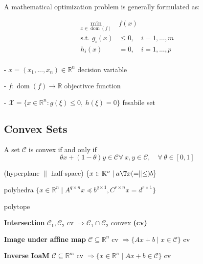 
A mathematical optimization problem is generally formulated as:

\begin{equation}
	\begin{aligned}
		\min_{x\in\operatorname{dom}(f)}          & f(x)                      \\
		\text{s.t. }                       g_i(x) & \le 0,\quad i = 1,\dots,m \\
		h_i(x)                                    & = 0,\quad i = 1,\dots,p   \\
	\end{aligned}
	\label{eq:optimization}
\end{equation}

- $x = (x_1,...,x_n) \in \mathbb{R}^{n}$ decision variable

- $f: \operatorname{dom}(f)\to\mathbb{R}$ objectivce function

- $\mathcal{X} = \{x \in \mathbb{R}^{n}: g(\xi)\le0,\ h(\xi)=0\}$ fesabile set


\subsection{Convex Sets}

\begin{definition}
	A set $\mathcal{C}$ is convex if and only if
	$$\theta x + (1-\theta)y \in \mathcal{C}
		\forall\ x,y \in \mathcal{C},\quad
		\forall\ \theta \in [0,1]$$
\end{definition}

(hyperplane $\parallel$ half-space)
$\{x \in \mathbb{R}^n \mid a\T x(=\parallel\le)b\}$

polyhedra $\{x\in\mathbb{R}^n\mid A^{q\times n}x\preceq b^{q\times1},C^{r\times n}x=d^{r\times1}\}$

polytope



\textbf{Intersection}
$\mathcal{C}_1, \mathcal{C}_2$ cv
$\Rightarrow \mathcal{C}_1 \cap \mathcal{C}_2$ convex \textbf{(cv)}

\textbf{Image under affine map}
$\mathcal{C} \subseteq  \mathbb{R}^{n}$ cv
$\Rightarrow \{Ax+b \mid x \in \mathcal{C} \}$ cv

\textbf{Inverse IoaM}
$\mathcal{C} \subseteq  \mathbb{R}^{m}$ cv
$\Rightarrow \{x\in\mathbb{R}^{n} \mid  Ax+b\in\mathcal{C}\}$ cv

